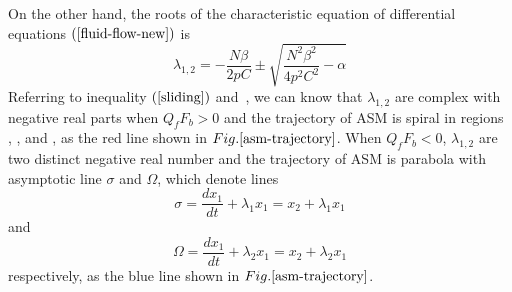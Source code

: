 \documentclass{sig-alternate-10pt}
\def\figurename{Fig.}
\begin{document}
On the other hand, the roots of the characteristic equation of differential equations $(\ref{fluid-flow-new})$ is
\begin{equation}
\lambda_{1,2}=-\frac{N\beta}{2pC}\pm \sqrt{\frac{N^2\beta^2}{4p^2C^2}-\alpha}
\end{equation}
Referring to inequality $(\ref{sliding})$ and~\cite{Itkis}, we can know that $\lambda_{1,2}$ are complex with negative real parts when $Q_fF_b>0$ and the trajectory of ASM is spiral in regions , ,  and , as the red line shown in $\figurename{\ref{asm-trajectory}}$. When $Q_fF_b<0$, $\lambda_{1,2}$ are two distinct negative real number and the trajectory of ASM is parabola with asymptotic line $\sigma$ and $\Omega$, which denote lines 
\begin{equation}
\sigma=\frac{dx_1}{dt}+\lambda_1x_1=x_2+\lambda_1x_1
\end{equation}
and
\begin{equation}
\Omega=\frac{dx_1}{dt}+\lambda_2x_1=x_2+\lambda_2x_1
\end{equation}
respectively, as the blue line shown in $\figurename{\ref{asm-trajectory}}$.
\end{document}
